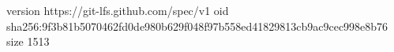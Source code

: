 version https://git-lfs.github.com/spec/v1
oid sha256:9f3b81b5070462fd0de980b629f048f97b558ed41829813cb9ac9cec998e8b76
size 1513
